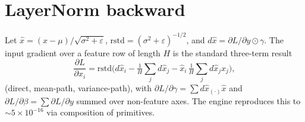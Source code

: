 \documentclass{article}
\begin{document}
\section{LayerNorm backward}\label{app:ln}
Let $\hat x=(x-\mu)/\sqrt{\sigma^2+\varepsilon}$, $\mathrm{rstd}=(\sigma^2+\varepsilon)^{-1/2}$, and $d\hat x=\partial L/\partial y\odot\gamma$. The input gradient over a feature row of length $H$ is the standard three-term result
\[
\frac{\partial L}{\partial x_i}=\mathrm{rstd}\Big(d\hat x_i-\tfrac1H\textstyle\sum_j d\hat x_j-\hat x_i\,\tfrac1H\sum_j d\hat x_j\hat x_j\Big),
\]
(direct, mean-path, variance-path), with $\partial L/\partial\gamma=\sum d\hat x_{(\cdot)}\hat x$ and $\partial L/\partial\beta=\sum \partial L/\partial y$ summed over non-feature axes. The engine reproduces this to $\sim\!5\times10^{-16}$ via composition of primitives.
\end{document}
